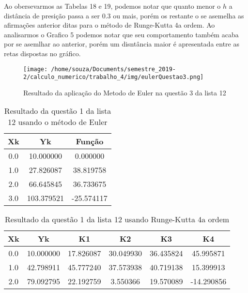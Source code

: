 \documentclass[12pt]{article}
\begin{document}
Ao obersevarmos as Tabelas 18 e 19, podemos notar que quanto menor o $h$ a distância de presição passa a ser 0.3 ou mais, porém os restante o se asemelha as afirmações anterior ditas para o método de Runge-Kutta 4a ordem. Ao analisarmos o Grafico 5 podemos notar que seu comportamento também acaba por se asemlhar ao anterior, porém um disntância maior é apresentada entre as retas dispostas no gráfico.


\begin{figure}[!h]
    \centering
    \texttt{[image: /home/souza/Documents/semestre\_2019-2/calculo\_numerico/trabalho\_4/img/eulerQuestao3.png]}
    \caption{Resultado da aplicação do Metodo de Euler na questão 3 da lista 12}
\end{figure}



\begin{table}[!h]
    \centering
\begin{tabular}{c|c|c}
\textbf{Xk} & \textbf{Yk} & \textbf{Função} \\ \hline
0.0         & 10.000000   & 0.000000        \\
1.0         & 27.826087   & 38.819758       \\
2.0         & 66.645845   & 36.733675       \\
3.0         & 103.379521  & -25.574117      \\ \hline
\end{tabular}
    \caption{Resultado da questão 1 da lista 12 usando o método de Euler}
\end{table}


\begin{table}[!h]
    \centering
\begin{tabular}{c|c|c|c|c|c}
\textbf{Xk} & \textbf{Yk} & \textbf{K1} & \textbf{K2} & \textbf{K3} & \textbf{K4} \\ \hline
0.0         & 10.000000   & 17.826087   & 30.049930   & 36.435824   & 45.995871   \\
1.0         & 42.798911   & 45.777240   & 37.573938   & 40.719138   & 15.399913   \\
2.0         & 79.092795   & 22.192759   & 3.550366    & 19.570089   & -14.290856  \\ \hline
\end{tabular}
    \caption{Resultado da questão 1 da lista 12 usando Runge-Kutta 4a ordem}
\end{table}
\end{document}
